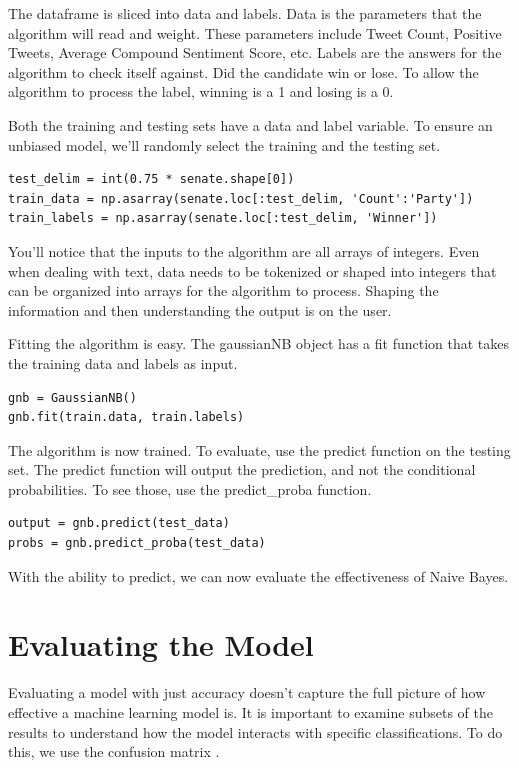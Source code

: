 \documentclass[11pt, twoside, reqno]{book}
\begin{document}
The dataframe is sliced into data and labels. Data is the parameters that the algorithm will read and weight. These parameters include Tweet Count, Positive Tweets, Average Compound Sentiment Score, etc. Labels are the answers for the algorithm to check itself against. Did the candidate win or lose. To allow the algorithm to process the label, winning is a 1 and losing is a 0. 

Both the training and testing sets have a data and label variable. To ensure an unbiased model, we'll randomly select the training and the testing set. 
\begin{verbatim}
test_delim = int(0.75 * senate.shape[0])
train_data = np.asarray(senate.loc[:test_delim, 'Count':'Party'])
train_labels = np.asarray(senate.loc[:test_delim, 'Winner'])
\end{verbatim}
You'll notice that the inputs to the algorithm are all arrays of integers. Even when dealing with text, data needs to be tokenized or shaped into integers that can be organized into arrays for the algorithm to process. Shaping the information and then understanding the output is on the user. 

Fitting the algorithm is easy. The gaussianNB object has a fit function that takes the training data and labels as input.
\begin{verbatim}
gnb = GaussianNB()
gnb.fit(train.data, train.labels)
\end{verbatim}

The algorithm is now trained. To evaluate, use the predict function on the testing set. The predict function will output the prediction, and not the conditional probabilities. To see those, use the predict\_proba function. 
\begin{verbatim}
output = gnb.predict(test_data)
probs = gnb.predict_proba(test_data)
\end{verbatim}
With the ability to predict, we can now evaluate the effectiveness of Naive Bayes. 
 
\section{Evaluating the Model}
\hspace{0.2in} Evaluating a model with just accuracy doesn't capture the full picture of how effective a machine learning model is. It is important to examine subsets of the results to understand how the model interacts with specific classifications. To do this, we use the confusion matrix \cite{fawcett}. 
\end{document}
